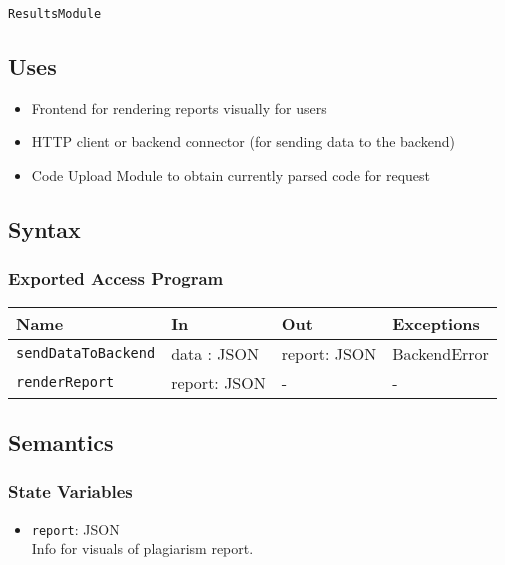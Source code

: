 \documentclass[12pt, titlepage]{article}
\begin{document}
\begin{itemize}
\texttt{ResultsModule}

\subsection{Uses}

\begin{itemize}
    \item Frontend for rendering reports visually for users
    \item HTTP client or backend connector (for sending data to the backend)
    \item Code Upload Module to obtain currently parsed code for request
\end{itemize}

\subsection{Syntax}

\subsubsection{Exported Access Program}

\begin{center}
\begin{tabular}{p{5cm} p{4cm} p{3.5cm} p{2cm}}
\hline
\textbf{Name} & \textbf{In} & \textbf{Out} & \textbf{Exceptions} \\
\hline
\texttt{sendDataToBackend} & data : JSON & report: JSON & BackendError \\
\texttt{renderReport} & report: JSON & - & - \\
\hline
\end{tabular}
\end{center}

\subsection{Semantics}

\subsubsection{State Variables}

\begin{itemize}
    \item \texttt{report}: JSON \\
    Info for visuals of plagiarism report.
\end{itemize}


\end{itemize}
\end{document}
